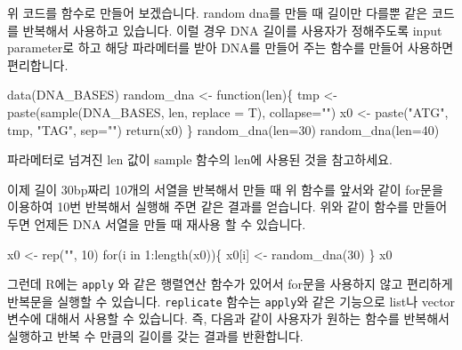 \documentclass[
  a4paper,
]{book}
\newenvironment{Shaded}{\begin{snugshade}}{\end{snugshade}}
\newcommand{\AttributeTok}[1]{\textcolor[rgb]{0.40,0.45,0.13}{#1}}
\newcommand{\ControlFlowTok}[1]{\textcolor[rgb]{0.00,0.23,0.31}{#1}}
\newcommand{\DecValTok}[1]{\textcolor[rgb]{0.68,0.00,0.00}{#1}}
\newcommand{\FunctionTok}[1]{\textcolor[rgb]{0.28,0.35,0.67}{#1}}
\newcommand{\NormalTok}[1]{\textcolor[rgb]{0.00,0.23,0.31}{#1}}
\newcommand{\OtherTok}[1]{\textcolor[rgb]{0.00,0.23,0.31}{#1}}
\newcommand{\SpecialCharTok}[1]{\textcolor[rgb]{0.37,0.37,0.37}{#1}}
\newcommand{\StringTok}[1]{\textcolor[rgb]{0.13,0.47,0.30}{#1}}
\begin{document}
위 코드를 함수로 만들어 보겠습니다. random dna를 만들 때 길이만 다를뿐
같은 코드를 반복해서 사용하고 있습니다. 이럴 경우 DNA 길이를 사용자가
정해주도록 input parameter로 하고 해당 파라메터를 받아 DNA를 만들어 주는
함수를 만들어 사용하면 편리합니다.

\begin{Shaded}
\begin{Highlighting}[]
\FunctionTok{data}\NormalTok{(DNA\_BASES)}
\NormalTok{random\_dna }\OtherTok{\textless{}{-}} \ControlFlowTok{function}\NormalTok{(len)\{}
\NormalTok{  tmp }\OtherTok{\textless{}{-}} \FunctionTok{paste}\NormalTok{(}\FunctionTok{sample}\NormalTok{(DNA\_BASES, len, }\AttributeTok{replace =}\NormalTok{ T), }\AttributeTok{collapse=}\StringTok{""}\NormalTok{)}
\NormalTok{  x0 }\OtherTok{\textless{}{-}} \FunctionTok{paste}\NormalTok{(}\StringTok{"ATG"}\NormalTok{, tmp, }\StringTok{"TAG"}\NormalTok{, }\AttributeTok{sep=}\StringTok{""}\NormalTok{)}
  \FunctionTok{return}\NormalTok{(x0)}
\NormalTok{\}}
\FunctionTok{random\_dna}\NormalTok{(}\AttributeTok{len=}\DecValTok{30}\NormalTok{)}
\FunctionTok{random\_dna}\NormalTok{(}\AttributeTok{len=}\DecValTok{40}\NormalTok{)}
\end{Highlighting}
\end{Shaded}

파라메터로 넘겨진 len 값이 sample 함수의 len에 사용된 것을 참고하세요.

이제 길이 30bp짜리 10개의 서열을 반복해서 만들 때 위 함수를 앞서와 같이
for문을 이용하여 10번 반복해서 실행해 주면 같은 결과를 얻습니다. 위와
같이 함수를 만들어 두면 언제든 DNA 서열을 만들 때 재사용 할 수 있습니다.

\begin{Shaded}
\begin{Highlighting}[]
\NormalTok{x0 }\OtherTok{\textless{}{-}} \FunctionTok{rep}\NormalTok{(}\StringTok{""}\NormalTok{, }\DecValTok{10}\NormalTok{)}
\ControlFlowTok{for}\NormalTok{(i }\ControlFlowTok{in} \DecValTok{1}\SpecialCharTok{:}\FunctionTok{length}\NormalTok{(x0))\{}
\NormalTok{  x0[i] }\OtherTok{\textless{}{-}} \FunctionTok{random\_dna}\NormalTok{(}\DecValTok{30}\NormalTok{)}
\NormalTok{\}}
\NormalTok{x0}
\end{Highlighting}
\end{Shaded}

그런데 R에는 \texttt{apply} 와 같은 행렬연산 함수가 있어서 for문을
사용하지 않고 편리하게 반복문을 실행할 수 있습니다. \texttt{replicate}
함수는 \texttt{apply}와 같은 기능으로 list나 vector 변수에 대해서 사용할
수 있습니다. 즉, 다음과 같이 사용자가 원하는 함수를 반복해서 실행하고
반복 수 만큼의 길이를 갖는 결과를 반환합니다.
\end{document}
